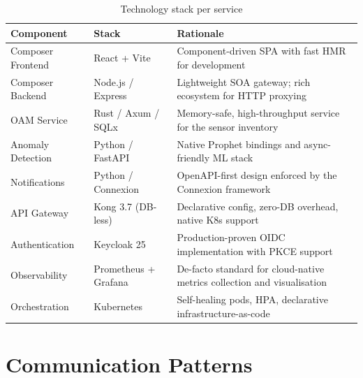 \documentclass[12pt,a4paper,oneside]{report}
\begin{document}
\begin{table}[H]
\centering
\caption{Technology stack per service}
\label{tab:tech}
\renewcommand{\arraystretch}{1.3}
\begin{tabularx}{\textwidth}{l l >{\raggedright\arraybackslash}X}
\toprule
\textbf{Component} & \textbf{Stack} & \textbf{Rationale} \\
\midrule
Composer Frontend    & React + Vite         & Component-driven SPA with fast HMR for development \\
Composer Backend     & Node.js / Express    & Lightweight SOA gateway; rich ecosystem for HTTP proxying \\
OAM Service          & Rust / Axum / SQLx   & Memory-safe, high-throughput service for the sensor inventory \\
Anomaly Detection    & Python / FastAPI     & Native Prophet bindings and async-friendly ML stack \\
Notifications        & Python / Connexion   & OpenAPI-first design enforced by the Connexion framework \\
API Gateway          & Kong 3.7 (DB-less)   & Declarative config, zero-DB overhead, native K8s support \\
Authentication       & Keycloak 25          & Production-proven OIDC implementation with PKCE support \\
Observability        & Prometheus + Grafana & De-facto standard for cloud-native metrics collection and visualisation \\
Orchestration        & Kubernetes           & Self-healing pods, HPA, declarative infrastructure-as-code \\
\bottomrule
\end{tabularx}
\end{table}

\section{Communication Patterns}
\end{document}
